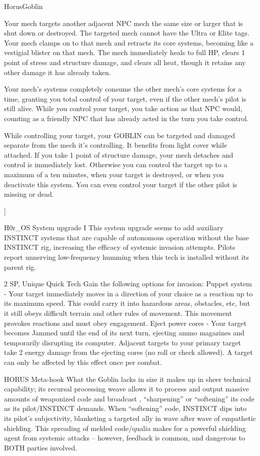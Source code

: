 \begin{mech}{Horus}{Goblin}
{Your mech targets another adjacent NPC mech the same size or larger that is shut down or destroyed. The targeted mech cannot have the Ultra or Elite tags. Your mech clamps on to that mech and retracts its core systems, becoming like a vestigial blister on that mech. The mech immediately heals to full HP, clears 1 point of stress and structure damage, and clears all heat, though it retains any other damage it has already taken.


Your mech’s systems completely consume the other mech’s core systems for a time, granting you total control of your target, even if the other mech’s pilot is still alive. While you control your target, you take action as that NPC would, counting as a friendly NPC that has already acted in the turn you take control.


While controlling your target, your GOBLIN can be targeted and damaged separate from the mech it’s controlling. It benefits from light cover while attached. If you take 1 point of structure damage, your mech detaches and control is immediately lost. Otherwise you can control the target up to a maximum of a ten minutes, when your target is destroyed, or when you deactivate this system. You can even control your target if the other pilot is missing or dead.
}]


H0r\_OS System upgrade I
This system upgrade seems to add auxiliary INSTINCT systems that are capable of autonomous operation without the base INSTINCT rig, increasing the efficacy of systemic invasion attempts. Pilots report unnerving low-frequency humming when this tech is installed without its parent rig.

2 SP, Unique
Quick Tech
Gain the following options for invasion:
Puppet system - Your target immediately moves in a direction of your choice as a reaction up to its maximum speed. This could carry it into hazardous areas, obstacles, etc, but it still obeys difficult terrain and other rules of movement. This movement provokes reactions and must obey engagement.
Eject power cores - Your target becomes Jammed until the end of its next turn, ejecting ammo magazines and temporarily disrupting its computer. Adjacent targets to your primary target take 2 energy damage from the ejecting cores (no roll or check allowed). A target can only be affected by this effect once per combat.

HORUS Meta-hook
What the Goblin lacks in size it makes up in sheer technical capability; its recursal processing weave allows it to process and output massive amounts of weaponized code and broadcast , “sharpening” or “softening” its code as its pilot/INSTINCT demands. When “softening” code, INSTINCT dips into its pilot’s subjectivity, blanketing a targeted ally in wave after wave of empathetic shielding. This spreading of melded code/qualia makes for a powerful shielding agent from systemic attacks -- however, feedback is common, and dangerous to BOTH parties involved.


\end{mech}
